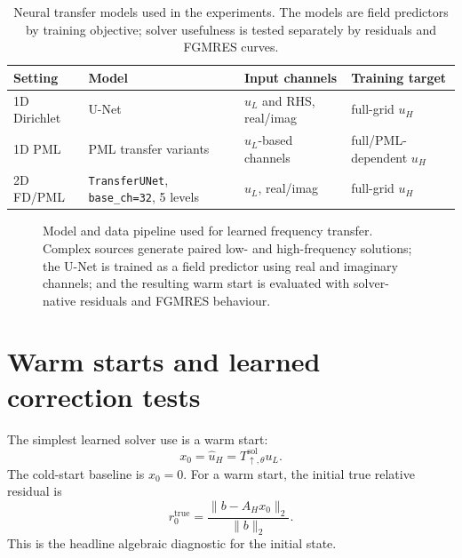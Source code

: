 \begin{table}[htbp]
\centering
\caption{Neural transfer models used in the experiments. The models are field
predictors by training objective; solver usefulness is tested separately by
residuals and FGMRES curves.}
\label{tab:setup-models}
\begin{tabular}{llll}
\toprule
Setting & Model & Input channels & Training target \\
\midrule
1D Dirichlet & U-Net & $u_L$ and RHS, real/imag & full-grid $u_H$ \\
1D PML & PML transfer variants & $u_L$-based channels & full/PML-dependent $u_H$ \\
2D FD/PML & \texttt{TransferUNet}, \texttt{base\_ch=32}, 5 levels &
$u_L$, real/imag & full-grid $u_H$ \\
\bottomrule
\end{tabular}
\end{table}

\begin{figure}[htbp]
    \centering
    \caption{Model and data pipeline used for learned frequency transfer. Complex sources generate paired low- and high-frequency solutions; the U-Net is trained as a field predictor using real and imaginary channels; and the resulting warm start is evaluated with solver-native residuals and FGMRES behaviour.}
    \label{fig:setup-model-data-pipeline}
\end{figure}

\section{Warm starts and learned correction tests}
\label{sec:setup-warm-starts-corrections}

The simplest learned solver use is a warm start:
\begin{equation}
    x_0=\hat{u}_H=T_{\uparrow,\theta}^{\mathrm{sol}}u_L.
    \label{eq:setup-warm-start}
\end{equation}
The cold-start baseline is $x_0=0$. For a warm start, the initial true
relative residual is
\begin{equation}
    r_0^{\mathrm{true}}
    =
    \frac{\|b-A_Hx_0\|_2}{\|b\|_2}.
    \label{eq:setup-true-initial-residual}
\end{equation}
This is the headline algebraic diagnostic for the initial state.

